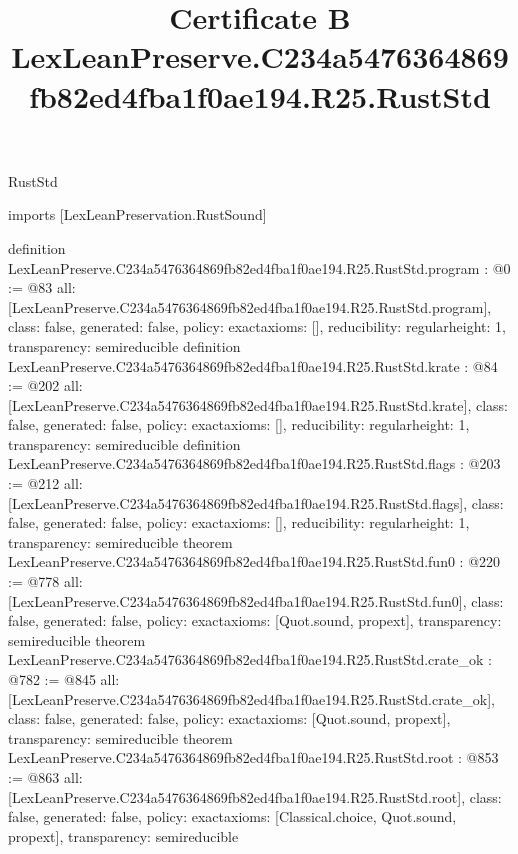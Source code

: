 \begin{lexlean}{RustStd}
\title{Certificate B LexLeanPreserve.C234a5476364869fb82ed4fba1f0ae194.R25.RustStd}
\begin{coremodule}
imports [LexLeanPreservation.RustSound]

definition LexLeanPreserve.C234a5476364869fb82ed4fba1f0ae194.R25.RustStd.program : @0 := @83 {
  all: [LexLeanPreserve.C234a5476364869fb82ed4fba1f0ae194.R25.RustStd.program],
  class: false,
  generated: false,
  policy: exact{axioms: []},
  reducibility: regular{height: 1},
  transparency: semireducible
}
definition LexLeanPreserve.C234a5476364869fb82ed4fba1f0ae194.R25.RustStd.krate : @84 := @202 {
  all: [LexLeanPreserve.C234a5476364869fb82ed4fba1f0ae194.R25.RustStd.krate],
  class: false,
  generated: false,
  policy: exact{axioms: []},
  reducibility: regular{height: 1},
  transparency: semireducible
}
definition LexLeanPreserve.C234a5476364869fb82ed4fba1f0ae194.R25.RustStd.flags : @203 := @212 {
  all: [LexLeanPreserve.C234a5476364869fb82ed4fba1f0ae194.R25.RustStd.flags],
  class: false,
  generated: false,
  policy: exact{axioms: []},
  reducibility: regular{height: 1},
  transparency: semireducible
}
theorem LexLeanPreserve.C234a5476364869fb82ed4fba1f0ae194.R25.RustStd.fun0 : @220 := @778 {
  all: [LexLeanPreserve.C234a5476364869fb82ed4fba1f0ae194.R25.RustStd.fun0],
  class: false,
  generated: false,
  policy: exact{axioms: [Quot.sound, propext]},
  transparency: semireducible
}
theorem LexLeanPreserve.C234a5476364869fb82ed4fba1f0ae194.R25.RustStd.crate_ok : @782 := @845 {
  all: [LexLeanPreserve.C234a5476364869fb82ed4fba1f0ae194.R25.RustStd.crate_ok],
  class: false,
  generated: false,
  policy: exact{axioms: [Quot.sound, propext]},
  transparency: semireducible
}
theorem LexLeanPreserve.C234a5476364869fb82ed4fba1f0ae194.R25.RustStd.root : @853 := @863 {
  all: [LexLeanPreserve.C234a5476364869fb82ed4fba1f0ae194.R25.RustStd.root],
  class: false,
  generated: false,
  policy: exact{axioms: [Classical.choice, Quot.sound, propext]},
  transparency: semireducible
}


\end{coremodule}
\end{lexlean}
